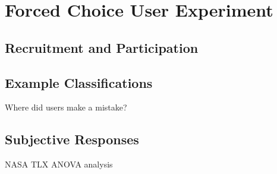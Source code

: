 

\section{Forced Choice User Experiment}

\subsection{Recruitment and Participation}

\subsection{Example Classifications}

Where did users make a mistake?

\subsection{Subjective Responses}

NASA TLX ANOVA analysis